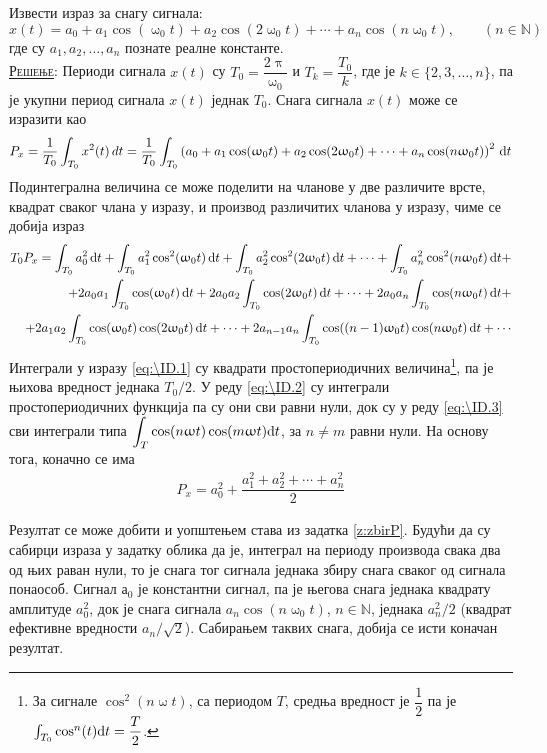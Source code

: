 \noindent 
\PID
Извести израз за снагу сигнала: 
$$
x(t) = a_0 + a_1\cos(\upomega_0 t) +
a_2 \cos(2\upomega_0 t) + \cdots 
+ a_n \cos(n\upomega_0 t), \qquad (n\in\mathbb N)
$$
где су $a_1, a_2, \ldots, a_n$ познате реалне
константе.
\\[2mm]

\textsc{\underline{Решење}}:
Периоди сигнала $x(t)$ су $T_0 = \dfrac{2\uppi}{\upomega_0}$ и $T_k = \dfrac{T_0}{k}$, где је $k \in \{2,3,\ldots,n\}$, 
па је укупни период сигнала $x(t)$ једнак $T_0$. Снага сигнала $x(t)$ може се изразити као 
\begin{equation}
P_x = \dfrac{1}{T_0}\int_{T_0} x^2(t) \, dt =  \dfrac{1}{T_0} \int_{T_0} \left( a_0 + a_1\cos(\upomega_0 t) +
a_2 \cos(2\upomega_0 t) + \cdots
+ a_n \cos(n\upomega_0 t) \right)^2 \, {\rm d} t \\
\end{equation}
Подинтегрална величина се може поделити на чланове у две различите врсте, квадрат сваког члана у изразу, и производ различитих
чланова у изразу, чиме се добија израз
\begin{eqnarray}
T_0 P_x = \int_{T_0} a_0^2 \, \de t + \int_{T_0} a_1^2\cos^2(\upomega_0 t) \, \de t   \label{eq:\ID.1}
+ \int_{T_0} a_2^2 \cos^2(2\upomega_0 t) \, \de t + \cdots + \int_{T_0} a_n^2 \cos^2(n\upomega_0 t) \, \de t + \\
+ 2a_0a_1\int_{T_0} \cos(\upomega_0 t) \, \de t + 
2a_0a_2\int_{T_0} \cos(2\upomega_0 t) \, \de t + \cdots + \label{eq:\ID.2}
2a_0a_n\int_{T_0} \cos(n\upomega_0 t) \, \de t + \\
+ 2a_1a_2\int_{T_0} \cos(\upomega_0 t)\cos(2\upomega_0 t) \, \de t + \cdots + 
2a_{n-1}a_n\int_{T_0} \cos((n-1)\upomega_0 t)\cos(n\upomega_0 t) \, \de t + \cdots   \label{eq:\ID.3}
\end{eqnarray}
Интеграли у изразу \eqref{eq:\ID.1} су квадрати простопериодичних величина\footnote{
За сигнале $\cos^2(n\upomega t)$, са периодом $T$, средња вредност је $\dfrac{1}{2}$ па је 
$\int_{T_0} \cos^n(t) {\rm d} t = \dfrac{T}{2}$.
}, па је њихова вредност једнака $T_0/2$. У реду \eqref{eq:\ID.2} су интеграли 
простопериодичних функција па су они сви равни нули, док су у реду \eqref{eq:\ID.3} сви интеграли типа 
$\displaystyle\int_T \cos(n\upomega t) \cos(m\upomega t) {\rm d} t$, за $n \neq m$ равни нули. На основу тога, 
коначно се има
\begin{eqnarray}
    P_x = a_0^2 + \dfrac{ a_1^2 + a_2^2 + \cdots + a_n^2 }{2}
\end{eqnarray}

Резултат се може добити и уопштењем става из задатка \ref{z:zbirP}. Будући да су сабирци израза у задатку облика 
да је, интеграл на периоду производа свака два од њих раван нули, то је снага тог сигнала једнака збиру снага сваког 
од сигнала понаособ. Сигнал $а_0$ је константни сигнал, па је његова снага једнака квадрату амплитуде 
$a_0^2$, док је снага сигнала $a_n \cos(n\upomega_0 t)$, $n \in \mathbb N$, једнака $a_n^2/2$ (квадрат ефективне вредности
$a_n/\sqrt 2$). Сабирањем таквих снага, добија се исти коначан резултат.
 